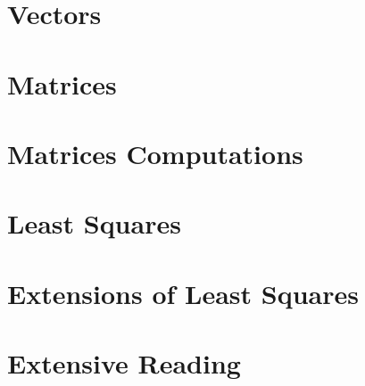 \ifdefined\printmath

\part{Vectors}







\part{Matrices}



\part{Matrices Computations}





\part{Least Squares}



\part{Extensions of Least Squares}




\part{Extensive Reading}



% 
% 
% 

% 

